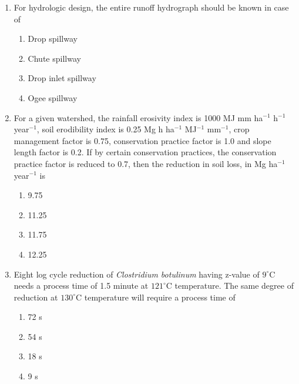\documentclass[journal]{IEEEtran}
\numberwithin{equation}{enumi}
\numberwithin{figure}{enumi}
\begin{document}
\begin{enumerate}
    
\item For hydrologic design, the entire runoff hydrograph should be known in case of
\begin{enumerate}
    \item Drop spillway   \hfill{}
    \item Chute spillway
    \item Drop inlet spillway
    \item Ogee spillway
    \end{enumerate}


    
\item  For a given watershed, the rainfall erosivity index is 1000 MJ mm ha$^{-1}$ h$^{-1}$ year$^{-1}$, soil erodibility index is 0.25 Mg h ha$^{-1}$ MJ$^{-1}$ mm$^{-1}$, crop management factor is 0.75, conservation practice factor is 1.0 and slope length factor is 0.2. If by certain conservation practices, the conservation practice factor is reduced to 0.7, then the reduction in soil loss, in Mg ha$^{-1}$ year$^{-1}$ is
\hfill{}
\begin{multicols}{4}
    \begin{enumerate}
    \item  9.75
    \item  11.25
    \item  11.75
    \item  12.25
    \end{enumerate}
    \end{multicols}

 

  \item Eight log cycle reduction of \textit{Clostridium botulinum} having z-value of $9^{\circ}\mathrm{C}$ needs a process time of 1.5 minute at $121^{\circ}\mathrm{C}$ temperature. The same degree of reduction at $130^{\circ}\mathrm{C}$ temperature will require a process time of
  \hfill{}
\begin{multicols}{4}
    \begin{enumerate}
    \item  72 s 
    \item  54 s
    \item  18 s
    \item  9 s
    \end{enumerate}
    \end{multicols}
  
   


\end{enumerate}
\end{document}
